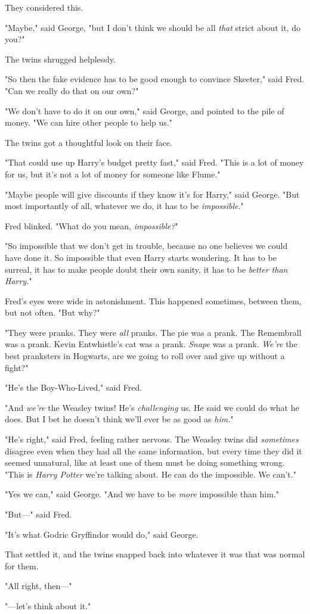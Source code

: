 They considered this.

"Maybe," said George, "but I don't think we should be all \emph{that} strict
about it, do you?"

The twins shrugged helplessly.

"So then the fake evidence has to be good enough to convince Skeeter," said
Fred. "Can we really do that on our own?"

"We don't have to do it on our own," said George, and pointed to the pile of
money. "We can hire other people to help us."

The twins got a thoughtful look on their face.

"That could use up Harry's budget pretty fast," said Fred. "This is a lot of
money for us, but it's not a lot of money for someone like Flume."

"Maybe people will give discounts if they know it's for Harry," said George.
"But most importantly of all, whatever we do, it has to be \emph{impossible}."

Fred blinked. "What do you mean, \emph{impossible?}"

"So impossible that we don't get in trouble, because no one believes we could
have done it. So impossible that even Harry starts wondering. It has to be
surreal, it has to make people doubt their own sanity, it has to be{\el}
\emph{better than Harry.}"

Fred's eyes were wide in astonishment. This happened sometimes, between them,
but not often. "But why?"

"They were pranks. They were \emph{all} pranks. The pie was a prank. The
Remembrall was a prank. Kevin Entwhistle's cat was a prank. \emph{Snape} was a
prank. \emph{We're} the best pranksters in Hogwarts, are we going to roll over
and give up without a fight?"

"He's the Boy-Who-Lived," said Fred.

"And \emph{we're} the Weasley twins! He's \emph{challenging} us. He said we
could do what he does. But I bet he doesn't think we'll ever be as good as
\emph{him.}"

"He's right," said Fred, feeling rather nervous. The Weasley twins did
\emph{sometimes} disagree even when they had all the same information, but
every time they did it seemed unnatural, like at least one of them must be
doing something wrong. "This is \emph{Harry Potter} we're talking about. He can
do the impossible. We can't."

"Yes we can," said George. "And we have to be \emph{more} impossible than him."

"But\mbox{---}" said Fred.

"It's what Godric Gryffindor would do," said George.

That settled it, and the twins snapped back into{\el} whatever it was that
was normal for them.

"All right, then\mbox{---}"

"---let's think about it."
